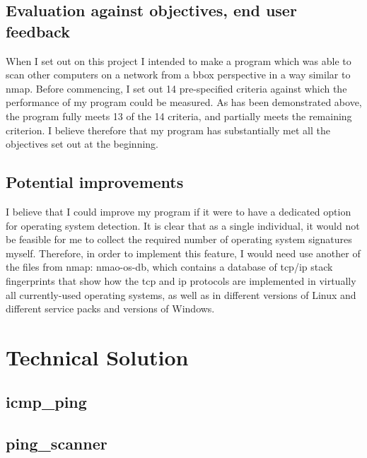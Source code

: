 \documentclass[titlepage]{article}
\let\Oldsection\section{}
\renewcommand{\section}{\clearpage\FloatBarrier\Oldsection}
\let\Oldsubsection\subsection{}
\renewcommand{\subsection}{\FloatBarrier\Oldsubsection}
\begin{document}
\subsection{Evaluation against objectives, end user feedback}
When I set out on this project I intended to make a program which was able to scan other
computers on a network from a \gls{bbox} perspective in a way similar to nmap.
Before commencing, I set out 14 pre-specified criteria against which the performance of my program
could be measured. As has been demonstrated above, the program fully meets 13 of the 14 criteria,
and partially meets the remaining criterion.
I believe therefore that my program has substantially met all the objectives set out
at the beginning.

\subsection{Potential improvements}
I believe that I could improve my program if it were to have a dedicated option for operating
system detection. 
It is clear that as a single individual, it would not be feasible for me to collect the required
number of operating system signatures myself. Therefore, in order to implement this feature,
I would need use another of the files from nmap: nmao-os-db, which contains
a database of \gls{tcp}/\gls{ip} stack fingerprints that show how the \gls{tcp} and \gls{ip}
protocols are implemented in virtually all currently-used operating systems, as well as in different
versions of Linux and different service packs and versions of Windows.

\clearpage
\appendix

\section{Technical Solution}\label{code}
\lstset{language=Python}
\subsection{icmp\_ping}\label{app:icmpping}



\subsection{ping\_scanner}\label{app:pingscanner}

\end{document}
